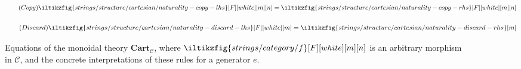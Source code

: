 \begin{figure}
    \centering
    \begin{minipage}{0.45\textwidth}
        \begin{equation}
            \tag{\(\mathsf{Copy}\)}
            \iltikzfig{strings/structure/cartesian/naturality-copy-lhs}[F][white][m][n]
            =
            \iltikzfig{strings/structure/cartesian/naturality-copy-rhs}[F][white][m][n]
            \label{eq:cartesian-copy}
        \end{equation}
        \begin{center}
            
        \end{center}
    \end{minipage}
    \qquad
    \begin{minipage}{0.4\textwidth}
        \centering
        \begin{equation}
            \tag{\(\mathsf{Discard}\)}
            \iltikzfig{strings/structure/cartesian/naturality-discard-lhs}[F][white][m]
            =
            \iltikzfig{strings/structure/cartesian/naturality-discard-rhs}[m]
            \label{eq:cartesian-discard}
        \end{equation}
        \begin{center}
            
        \end{center}
    \end{minipage}
    \caption{
        Equations of the monoidal theory \(\mathbf{Cart}_\mathcal{C}\),
        where \(\iltikzfig{strings/category/f}[F][white][m][n]\) is an arbitrary
        morphism in \(\mathcal{C}\), and the concrete interpretations of
        these rules for a generator \(e\).
    }
    \label{fig:cartesian-equations}
\end{figure}
